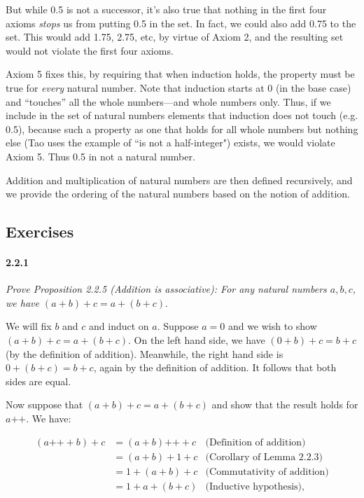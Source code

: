 \documentclass{article}
\newcommand{\pp}{{\texttt{++}}}
\begin{document}
But while 0.5 is not a successor, it's also true that nothing in the first four axioms \textit{stops} us from putting 0.5 in the set. In fact, we could also add 0.75 to the set. This would add 1.75, 2.75, etc, by virtue of Axiom 2, and the resulting set would not violate the first four axioms.

Axiom 5 fixes this, by requiring that when induction holds, the property must be true for \textit{every} natural number. Note that induction starts at 0 (in the base case) and ``touches'' all the whole numbers---and whole numbers only. Thus, if we include in the set of natural numbers elements that induction does not touch (e.g. 0.5), because such a property as one that holds for all whole numbers but nothing else (Tao uses the example of ``is not a half-integer") exists, we would violate Axiom 5. Thus 0.5 in not a natural number.

Addition and multiplication of natural numbers are then defined recursively, and we provide the ordering of the natural numbers based on the notion of addition. 

\subsection*{Exercises}
\paragraph{2.2.1} \textit{Prove Proposition 2.2.5 (Addition is associative): For any natural numbers $a,b,c$, we have $(a + b) + c = a + (b + c)$}.

We will fix $b$ and $c$ and induct on $a$. Suppose $a = 0$ and we wish to show $(a+b) + c = a + (b + c)$. On the left hand side, we have $(0 + b) + c = b + c$ (by the definition of addition). Meanwhile, the right hand side is $0 + (b + c) = b + c$, again by the definition of addition. It follows that both sides are equal.

Now suppose that $(a+b) + c = a + (b + c)$ and show that the result holds for $a\pp$. We have:

\begin{align*}
(a\pp + b) + c &= (a + b)\pp + c & \text{(Definition of addition)}\\
&= (a + b) + 1 + c & \text{(Corollary of Lemma 2.2.3)} \\
&= 1 + (a + b) + c & \text{(Commutativity of addition)} \\
&= 1 + a + (b + c) & \text{(Inductive hypothesis)},
\end{align*}
\end{document}
